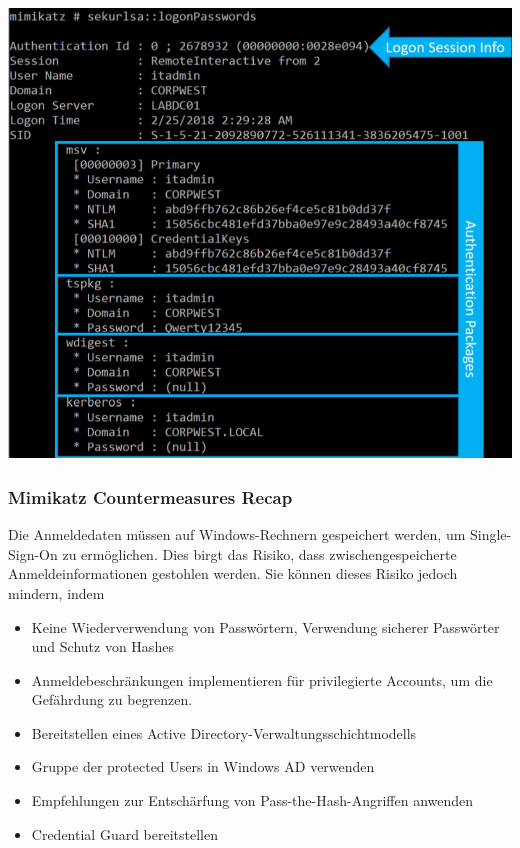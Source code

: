 \begin{center}
    \vspace{-8pt}
    \includegraphics[width=1.0\linewidth]{./img/05-mimikatz/mimikatz_output}
\end{center}

\subsubsection{Mimikatz Countermeasures Recap}
Die Anmeldedaten müssen auf Windows-Rechnern gespeichert werden, um Single-Sign-On zu ermöglichen. Dies birgt das Risiko, dass zwischengespeicherte Anmeldeinformationen gestohlen werden. Sie können dieses Risiko jedoch mindern, indem
\begin{itemize}
    \item Keine Wiederverwendung von Passwörtern, Verwendung sicherer Passwörter und Schutz von Hashes
    \item Anmeldebeschränkungen implementieren für privilegierte Accounts, um die Gefährdung zu begrenzen.
    \item Bereitstellen eines Active Directory-Verwaltungsschichtmodells
    \item Gruppe der protected Users in Windows AD verwenden
    \item Empfehlungen zur Entschärfung von Pass-the-Hash-Angriffen anwenden
    \item Credential Guard bereitstellen
\end{itemize}

